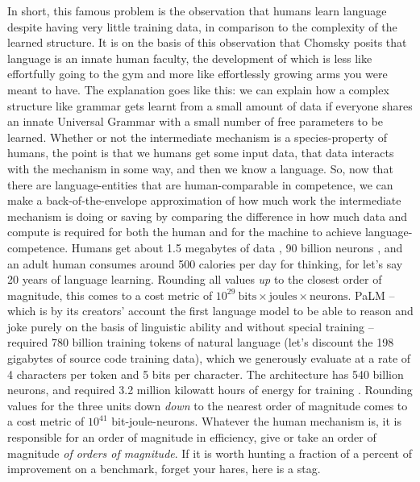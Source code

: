 In short, this famous problem is the observation that humans learn language despite having very little training data, in comparison to the complexity of the learned structure. It is on the basis of this observation that Chomsky posits \citep{chomsky_new_2000} that language is an innate human faculty, the development of which is less like effortfully going to the gym and more like effortlessly growing arms you were meant to have. The explanation goes like this: we can explain how a complex structure like grammar gets learnt from a small amount of data if everyone shares an innate Universal Grammar with a small number of free parameters to be learned. Whether or not the intermediate mechanism is a species-property of humans, the point is that we humans get some input data, that data interacts with the mechanism in some way, and then we know a language. So, now that there are language-entities that are human-comparable in competence, we can make a back-of-the-envelope approximation of how much work the intermediate mechanism is doing or saving by comparing the difference in how much data and compute is required for both the human and for the machine to achieve language-competence. Humans get about 1.5 megabytes of data \citep{mollica_humans_2019}, 90 billion neurons \citep{herculano-houzel_remarkable_2012}, and an adult human consumes around 500 calories per day for thinking, for let's say 20 years of language learning. Rounding all values \emph{up} to the closest order of magnitude, this comes to a cost metric of $10^{29} \ \text{bits} \times \text{joules} \times \text{neurons}$. PaLM -- which is by its creators' account the first language model to be able to reason and joke purely on the basis of linguistic ability and without special training \citep{chowdhery_palm_2022,narang_pathways_2022} -- required 780 billion training tokens of natural language (let's discount the 198 gigabytes of source code training data), which we generously evaluate at a rate of 4 characters per token \citep{khan_what_2023} and 5 bits per character. The architecture has 540 billion neurons, and required 3.2 million kilowatt hours of energy for training \citep{tom_goldstein_tomgoldsteincs_training_2022}. Rounding values for the three units down \emph{down} to the nearest order of magnitude comes to a cost metric of $10^{41}$ bit-joule-neurons. Whatever the human mechanism is, it is responsible for an order of magnitude in efficiency, give or take an order of magnitude \emph{of orders of magnitude}. If it is worth hunting a fraction of a percent of improvement on a benchmark, forget your hares, here is a stag.\\

